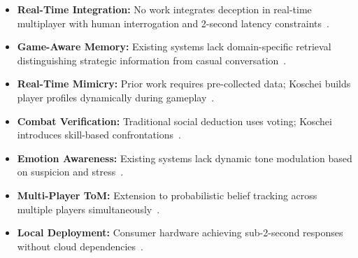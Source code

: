 \begin{itemize}
    \item \textbf{Real-Time Integration:} No work integrates deception in real-time multiplayer with human interrogation and 2-second latency constraints~\cite{park2023generative,hagendorff2023}.
    
    \item \textbf{Game-Aware Memory:} Existing systems lack domain-specific retrieval distinguishing strategic information from casual conversation~\cite{hong2025,wangw2024}.
    
    \item \textbf{Real-Time Mimicry:} Prior work requires pre-collected data; Koschei builds player profiles dynamically during gameplay~\cite{mikros2023,kolenbrander2023}.
    
    \item \textbf{Combat Verification:} Traditional social deduction uses voting; Koschei introduces skill-based confrontations~\cite{motoo2021,yoo2023}.
    
    \item \textbf{Emotion Awareness:} Existing systems lack dynamic tone modulation based on suspicion and stress~\cite{yoo2023}.
    
    \item \textbf{Multi-Player ToM:} Extension to probabilistic belief tracking across multiple players simultaneously~\cite{park2023generative}.
    
    \item \textbf{Local Deployment:} Consumer hardware achieving sub-2-second responses without cloud dependencies~\cite{wangw2024}.
\end{itemize}

